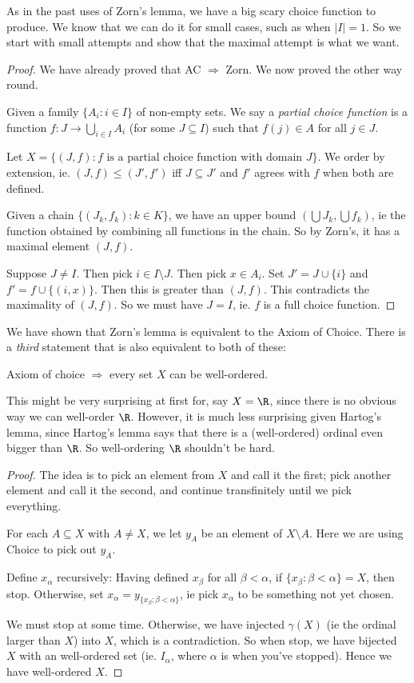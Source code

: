 \documentclass[a4paper]{article}
\begin{document}
As in the past uses of Zorn's lemma, we have a big scary choice function to produce. We know that we can do it for small cases, such as when $|I| = 1$. So we start with small attempts and show that the maximal attempt is what we want.
\begin{proof}
  We have already proved that AC $\Rightarrow $ Zorn. We now proved the other way round.

  Given a family $\{A_i: i\in I\}$ of non-empty sets. We say a \emph{partial choice function} is a function $f: J\to \bigcup_{i\in I}A_i$ (for some $J\subseteq I$) such that $f(j)\in A$ for all $j\in J$.

  Let $X = \{(J, f): f\text{ is a partial choice function with domain }J\}$. We order by extension, ie. $(J, f) \leq (J', f')$ iff $J\subseteq J'$ and $f'$ agrees with $f$ when both are defined.

  Given a chain $\{(J_k, f_k): k\in K\}$, we have an upper bound $\left(\bigcup J_k, \bigcup f_k\right)$, ie the function obtained by combining all functions in the chain. So by Zorn's, it has a maximal element $(J, f)$.

  Suppose $J \not = I$. Then pick $i\in I\setminus J$. Then pick $x\in A_i$. Set $J' = J\cup \{i\}$ and $f' = f\cup\{(i, x)\}$. Then this is greater than $(J, f)$. This contradicts the maximality of $(J, f)$. So we must have $J = I$, ie. $f$ is a full choice function.
\end{proof}

We have shown that Zorn's lemma is equivalent to the Axiom of Choice. There is a \emph{third} statement that is also equivalent to both of these:
\begin{thm}
  Axiom of choice $\Rightarrow$ every set $X$ can be well-ordered.
\end{thm}
This might be very surprising at first for, say $X = \R$, since there is no obvious way we can well-order $\R$. However, it is much less surprising given Hartog's lemma, since Hartog's lemma says that there is a (well-ordered) ordinal even bigger than $\R$. So well-ordering $\R$ shouldn't be hard.

\begin{proof}
  The idea is to pick an element from $X$ and call it the first; pick another element and call it the second, and continue transfinitely until we pick everything.

  For each $A\subseteq X$ with $A\not= X$, we let $y_A$ be an element of $X\setminus A$. Here we are using Choice to pick out $y_A$.

  Define $x_\alpha$ recursively: Having defined $x_{\beta}$ for all $\beta < \alpha$, if $\{x_\beta: \beta < \alpha\} = X$, then stop. Otherwise, set $x_\alpha = y_{\{x_\beta: \beta< \alpha\}}$, ie pick $x_\alpha$ to be something not yet chosen.

  We must stop at some time. Otherwise, we have injected $\gamma(X)$ (ie the ordinal larger than $X$) into $X$, which is a contradiction. So when stop, we have bijected $X$ with an well-ordered set (ie. $I_\alpha$, where $\alpha$ is when you've stopped). Hence we have well-ordered $X$.
\end{proof}
\end{document}
